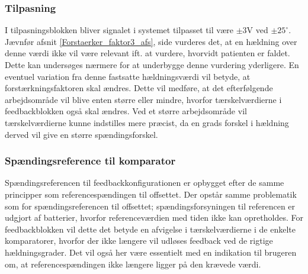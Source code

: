 \subsubsection{Tilpasning}
I tilpasningsblokken bliver signalet i systemet tilpasset til være $\pm3$V ved $\pm25^{\circ}$. Jævnfør afsnit \ref{Forstaerker_faktor3_afs}, side \pageref{Forstaerker_faktor3_afs} vurderes det, at en hældning over denne værdi ikke vil være relevant ift. at vurdere, hvorvidt patienten er faldet. Dette kan undersøges nærmere for at underbygge denne vurdering yderligere. En eventuel variation fra denne fastsatte hældningsværdi vil betyde, at forstærkningsfaktoren skal ændres. Dette vil medføre, at det efterfølgende arbejdsområde vil blive enten større eller mindre, hvorfor tærskelværdierne i feedbackblokken også skal ændres. Ved et større arbejdsområde vil tærskelværdierne kunne indstilles mere præcist, da en grads forskel i hældning derved vil give en større spændingsforskel.

\subsubsection{Spændingsreference til komparator}
Spændingsreferencen til feedbackkonfigurationen er opbygget efter de samme principper som referencespændingen til offsettet. Der opstår samme problematik som for spændingsreferencen til offsettet; spændingsforsyningen til referencen er udgjort af batterier, hvorfor referenceværdien med tiden ikke kan opretholdes. For feedbackblokken vil dette det betyde en afvigelse i tærskelværdierne i de enkelte komparatorer, hvorfor der ikke længere vil udløses feedback ved de rigtige hældningsgrader. Det vil også her være essentielt med en indikation til brugeren om, at referencespændingen ikke længere ligger på den krævede værdi. 

